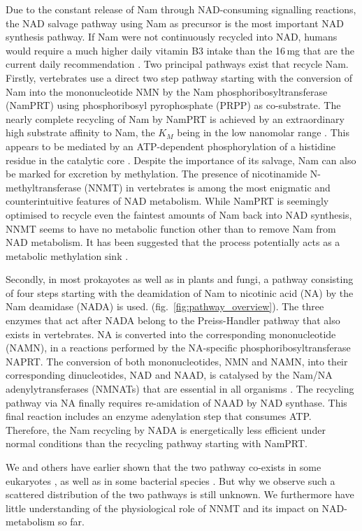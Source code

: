 Due to the constant release of Nam through NAD-consuming signalling reactions, the NAD salvage pathway using Nam as precursor is the most important NAD synthesis pathway. If Nam were not continuously recycled into NAD, humans would require a much higher daily vitamin B3 intake than the 16\,mg that are the current daily recommendation \cite{CommissionofEuropeanCommunities2008}. Two principal pathways exist that recycle Nam. Firstly, vertebrates use a direct two step pathway starting with the conversion of Nam into the mononucleotide NMN by the Nam phosphoribosyltransferase (NamPRT) using phosphoribosyl pyrophosphate (PRPP) as co-substrate. The nearly complete recycling of Nam by NamPRT is achieved by an extraordinary high substrate affinity to Nam, the $K_{M}$ being in the low nanomolar range \cite{Burgos2008}. This appears to be mediated by an ATP-dependent phosphorylation of a histidine residue in the catalytic core \cite{Burgos2009}. Despite the importance of its salvage, Nam can also be marked for excretion by methylation. The presence of nicotinamide N-methyltransferase (NNMT) in vertebrates \cite{Gossmann2012FEBS} is among the most enigmatic and counterintuitive features of NAD metabolism. While NamPRT is seemingly optimised to recycle even the faintest amounts of Nam back into NAD synthesis, NNMT seems to have no metabolic function other than to remove Nam from NAD metabolism. It has been suggested that the process potentially acts as a metabolic methylation sink \cite{Pissios2017}.

Secondly, in most prokayotes as well as in plants and fungi, a pathway consisting of four steps starting with the deamidation of Nam to nicotinic acid (NA) by the Nam deamidase (NADA) is used. (fig.~\ref{fig:pathway_overview}). The three enzymes that act after NADA belong to the Preiss-Handler pathway that also exists in vertebrates. NA is converted into the corresponding mononucleotide (NAMN), in a reactions performed by the NA-specific phosphoribosyltransferase NAPRT. The conversion of both mononucleotides, NMN and NAMN, into their corresponding dinucleotides, NAD and NAAD, is catalysed by the Nam/NA adenylytransferases (NMNATs) that are essential in all organisms \cite{DeFigueiredo2011}. The recycling pathway via NA finally requires re-amidation of NAAD by NAD synthase. This final reaction includes an enzyme adenylation step that consumes ATP. Therefore, the Nam recycling by NADA is energetically less efficient under normal conditions than the recycling pathway starting with NamPRT.

We and others have earlier shown that the two pathway co-exists in some eukaryotes \cite{Gossmann2012FEBS,Carneiro2013}, as well as in some bacterial species \cite{Gazzaniga2009}. But why we observe such a scattered distribution of the two pathways is still unknown. We furthermore have little understanding of the physiological role of NNMT and its impact on NAD-metabolism so far.

